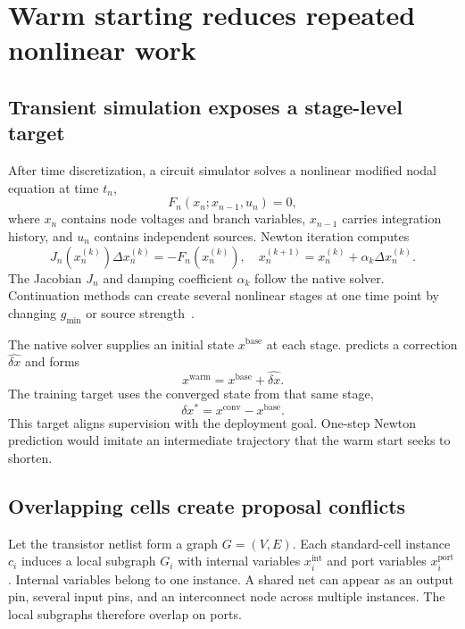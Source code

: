 \section{Warm starting reduces repeated nonlinear work}
\label{sec:background}

\subsection{Transient simulation exposes a stage-level target}

After time discretization, a circuit simulator solves a nonlinear modified nodal equation at time $t_n$,
\begin{equation}
F_n(x_n;x_{n-1},u_n)=0,
\label{eq:nonlinear}
\end{equation}
where $x_n$ contains node voltages and branch variables, $x_{n-1}$ carries integration history, and $u_n$ contains independent sources. Newton iteration computes
\begin{equation}
J_n(x_n^{(k)})\Delta x_n^{(k)}=-F_n(x_n^{(k)}), \quad
x_n^{(k+1)}=x_n^{(k)}+\alpha_k\Delta x_n^{(k)}.
\label{eq:newton}
\end{equation}
The Jacobian $J_n$ and damping coefficient $\alpha_k$ follow the native solver. Continuation methods can create several nonlinear stages at one time point by changing $g_{\min}$ or source strength~\cite{kundert1990steady}.

The native solver supplies an initial state $x^{\mathrm{base}}$ at each stage. \system{} predicts a correction $\widehat{\delta x}$ and forms
\begin{equation}
x^{\mathrm{warm}}=x^{\mathrm{base}}+\widehat{\delta x}.
\label{eq:warm}
\end{equation}
The training target uses the converged state from that same stage,
\begin{equation}
\delta x^*=x^{\mathrm{conv}}-x^{\mathrm{base}}.
\label{eq:target}
\end{equation}
This target aligns supervision with the deployment goal. One-step Newton prediction would imitate an intermediate trajectory that the warm start seeks to shorten.

\subsection{Overlapping cells create proposal conflicts}

Let the transistor netlist form a graph $G=(V,E)$. Each standard-cell instance $c_i$ induces a local subgraph $G_i$ with internal variables $x_i^{\mathrm{int}}$ and port variables $x_i^{\mathrm{port}}$. Internal variables belong to one instance. A shared net can appear as an output pin, several input pins, and an interconnect node across multiple instances. The local subgraphs therefore overlap on ports.

